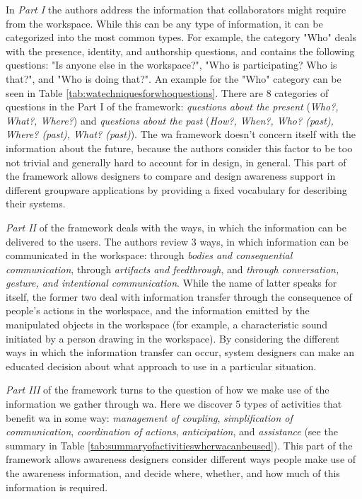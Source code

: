 In \textit{Part I} the authors address the information that collaborators might require from the workspace. While this can be any type of information, it can be categorized into the most common types. For example, the category "Who" deals with the presence, identity, and authorship questions, and contains the following questions: "Is anyone else in the workspace?", "Who is participating? Who is that?", and "Who is doing that?". An example for the "Who" category can be seen in Table \ref{tab:watechniquesforwhoquestions}. There are 8 categories of questions in the Part I of the framework: \textit{questions about the present} (\textit{Who?, What?, Where?}) and \textit{questions about the past} (\textit{How?, When?, Who? (past), Where? (past), What? (past)}). The \gls{wa} framework doesn't concern itself with the information about the future, because the authors consider this factor to be too not trivial and generally hard to account for in design, in general.
This part of the framework allows designers to compare and design awareness support in different groupware applications by providing a fixed vocabulary for describing their systems.

\textit{Part II} of the framework deals with the ways, in which the information can be delivered to the users. The authors review 3 ways, in which information can be communicated in the workspace: through \textit{bodies and consequential communication}, through \textit{artifacts and feedthrough}, and \textit{through conversation, gesture, and intentional communication}. While the name of latter speaks for itself, the former two deal with information transfer through the consequence of people's actions in the workspace, and the information emitted by the manipulated objects in the workspace (for example, a characteristic sound initiated by a person drawing in the workspace).
By considering the different ways in which the information transfer can occur, system designers can make an educated decision about what approach to use in a particular situation.

\textit{Part III} of the framework turns to the question of how we make use of the information we gather through \gls{wa}. Here we discover 5 types of activities that benefit \gls{wa} in some way: \textit{management of coupling}, \textit{simplification of communication}, \textit{coordination of actions}, \textit{anticipation}, and \textit{assistance} (see the summary in Table \ref{tab:summaryofactivitieswherwacanbeused}).
This part of the framework allows awareness designers consider different ways people make use of the awareness information, and decide where, whether, and how much of this information is required.

